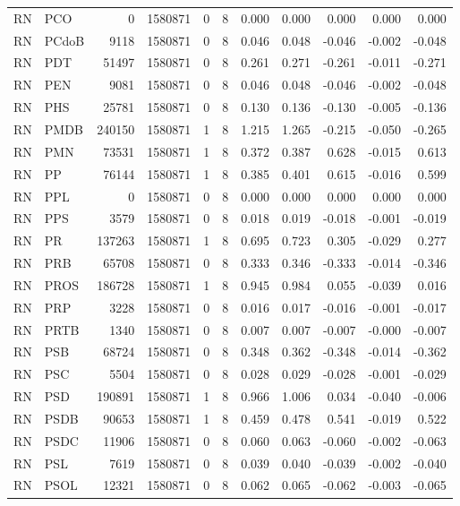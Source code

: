 \begin{landscape}
\begin{longtable}{llrrrrrrrrr}
RN & PCO & 0 & 1580871 & 0 & 8 & 0.000 & 0.000 & 0.000 & 0.000 & 0.000 \\
RN & PCdoB & 9118 & 1580871 & 0 & 8 & 0.046 & 0.048 & -0.046 & -0.002 & -0.048 \\
RN & PDT & 51497 & 1580871 & 0 & 8 & 0.261 & 0.271 & -0.261 & -0.011 & -0.271 \\
RN & PEN & 9081 & 1580871 & 0 & 8 & 0.046 & 0.048 & -0.046 & -0.002 & -0.048 \\
RN & PHS & 25781 & 1580871 & 0 & 8 & 0.130 & 0.136 & -0.130 & -0.005 & -0.136 \\
RN & PMDB & 240150 & 1580871 & 1 & 8 & 1.215 & 1.265 & -0.215 & -0.050 & -0.265 \\
RN & PMN & 73531 & 1580871 & 1 & 8 & 0.372 & 0.387 & 0.628 & -0.015 & 0.613 \\
RN & PP & 76144 & 1580871 & 1 & 8 & 0.385 & 0.401 & 0.615 & -0.016 & 0.599 \\
RN & PPL & 0 & 1580871 & 0 & 8 & 0.000 & 0.000 & 0.000 & 0.000 & 0.000 \\
RN & PPS & 3579 & 1580871 & 0 & 8 & 0.018 & 0.019 & -0.018 & -0.001 & -0.019 \\
RN & PR & 137263 & 1580871 & 1 & 8 & 0.695 & 0.723 & 0.305 & -0.029 & 0.277 \\
RN & PRB & 65708 & 1580871 & 0 & 8 & 0.333 & 0.346 & -0.333 & -0.014 & -0.346 \\
RN & PROS & 186728 & 1580871 & 1 & 8 & 0.945 & 0.984 & 0.055 & -0.039 & 0.016 \\
RN & PRP & 3228 & 1580871 & 0 & 8 & 0.016 & 0.017 & -0.016 & -0.001 & -0.017 \\
RN & PRTB & 1340 & 1580871 & 0 & 8 & 0.007 & 0.007 & -0.007 & -0.000 & -0.007 \\
RN & PSB & 68724 & 1580871 & 0 & 8 & 0.348 & 0.362 & -0.348 & -0.014 & -0.362 \\
RN & PSC & 5504 & 1580871 & 0 & 8 & 0.028 & 0.029 & -0.028 & -0.001 & -0.029 \\
RN & PSD & 190891 & 1580871 & 1 & 8 & 0.966 & 1.006 & 0.034 & -0.040 & -0.006 \\
RN & PSDB & 90653 & 1580871 & 1 & 8 & 0.459 & 0.478 & 0.541 & -0.019 & 0.522 \\
RN & PSDC & 11906 & 1580871 & 0 & 8 & 0.060 & 0.063 & -0.060 & -0.002 & -0.063 \\
RN & PSL & 7619 & 1580871 & 0 & 8 & 0.039 & 0.040 & -0.039 & -0.002 & -0.040 \\
RN & PSOL & 12321 & 1580871 & 0 & 8 & 0.062 & 0.065 & -0.062 & -0.003 & -0.065 \\

\end{longtable}
\end{landscape}
